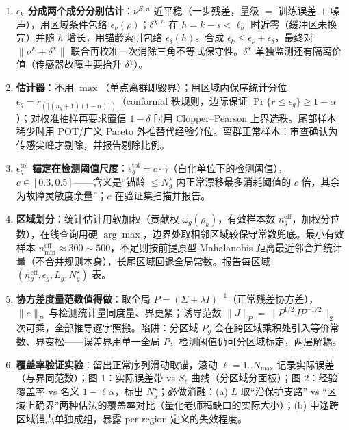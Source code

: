 \documentclass[11pt,a4paper]{ctexart}
\theoremstyle{remark}
\begin{document}
\begin{enumerate}
\item \textbf{$\epsilon_k$ 分成两个成分分别估计}：$\nu^{E,n}$ 近平稳（一步残差，量级 $=$ 训练误差 $+$ 噪声），用区域条件包络 $\epsilon_\nu(\rho)$；$\delta^{\chi,n}$ 在 $h=k-s<\ell_h$ 时近零（缓冲区未换完）并随 $h$ 增长，用锚龄索引包络 $\epsilon_\delta(h)$。合成 $\epsilon_k\le\epsilon_\nu+\epsilon_\delta$，最终对 $\|\nu^E+\delta^\chi\|$ 联合再校准一次消除三角不等式保守性。$\delta^\chi$ 单独监测还有隔离价值（传感器故障主要抬升 $\delta^\chi$）。
\item \textbf{估计器}：不用 $\max$（单点离群即毁界）；用区域内保序统计分位 $\epsilon_g=r_{(\lceil(n_g+1)(1-\alpha)\rceil)}$（conformal 秩规则，边际保证 $\Pr\{r\le\epsilon_g\}\ge1-\alpha$）；对校准抽样再要求置信 $1-\delta$ 时用 Clopper--Pearson 上界选秩。尾部样本稀少时用 POT/广义 Pareto 外推替代经验分位。离群正常样本：审查确认为传感尖峰才剔除，并报告剔除比例。
\item \textbf{$\epsilon^{\mathrm{tol}}_g$ 锚定在检测阈值尺度}：$\epsilon^{\mathrm{tol}}_g=c\cdot\gamma$（白化单位下的检测阈值），$c\in[0.3,0.5]$——含义是“锚龄 $\le N^\star_g$ 内正常漂移最多消耗阈值的 $c$ 倍，其余为故障灵敏度余量”；$c$ 在验证集扫描并报告。
\item \textbf{区域划分}：统计估计用软加权（贡献权 $\omega_g(\rho_k)$，有效样本数 $n^{\mathrm{eff}}_g$，加权分位数），在线查询用硬 $\arg\max$，边界处取相邻区域较保守常数兜底。最小有效样本 $n^{\mathrm{eff}}_{\min}\approx300\sim500$，不足则按前提原型 Mahalanobis 距离最近邻合并统计量（不合并规则本身），长尾区域回退全局常数。报告每区域 $(n^{\mathrm{eff}}_g,\epsilon_g,L_g,N^\star_g)$ 表。
\item \textbf{协方差度量范数值得做}：取全局 $P=(\Sigma+\lambda I)^{-1}$（正常残差协方差），$\|e\|_P$ 与检测统计量同度量、界更紧；诱导范数 $\|J\|_P=\|P^{1/2}JP^{-1/2}\|_2$ 次可乘，全部推导逐字照搬。陷阱：分区域 $P_g$ 会在跨区域乘积处引入等价常数、界变松——误差界用单一全局 $P$，检测阈值仍可分区域标定，两层解耦。
\item \textbf{覆盖率验证实验}：留出正常序列滑动取锚，滚动 $\ell=1..N_{\max}$ 记录实际误差（与界同范数）；图 1：实际误差带 vs $S_\ell$ 曲线（分区域分面板）；图 2：经验覆盖率 vs 名义 $1-\ell\alpha$，标出 $N^\star_g$；必做消融：(a) $L$ 取“沿保护支路” vs “区域上确界”两种估法的覆盖率对比（量化老师稿缺口的实际大小）；(b) 中途跨区域锚点单独成组，暴露 per-region 定义的失效程度。
\end{enumerate}

\end{document}
